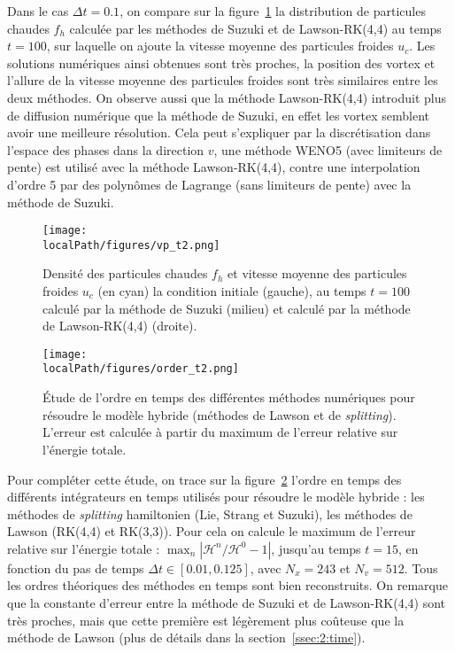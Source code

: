 Dans le cas $\Delta t=0.1$, on compare sur la figure~\ref{fig:vp:t2} la distribution de particules chaudes $f_h$ calculée par les méthodes de Suzuki et de Lawson-RK(4,4) au temps $t=100$, sur laquelle on ajoute la vitesse moyenne des particules froides $u_c$. Les solutions numériques ainsi obtenues sont très proches, la position des vortex et l'allure de la vitesse moyenne des particules froides sont très similaires entre les deux méthodes. On observe aussi que la méthode Lawson-RK(4,4) introduit plus de diffusion numérique que la méthode de Suzuki, en effet les vortex semblent avoir une meilleure résolution. Cela peut s'expliquer par la discrétisation dans l'espace des phases dans la direction $v$, une méthode WENO5 (avec limiteurs de pente) est utilisé avec la méthode Lawson-RK(4,4), contre une interpolation d'ordre 5 par des polynômes de Lagrange (sans limiteurs de pente) avec la méthode de Suzuki.

\begin{figure}[h]
  \centering
  \texttt{[image: \\localPath/figures/vp\_t2.png]}
  \caption{Densité des particules chaudes $f_h$ et vitesse moyenne des particules froides $u_c$ (en cyan) la condition initiale (gauche), au temps $t=100$ calculé par la méthode de Suzuki (milieu) et calculé par la méthode de Lawson-RK(4,4) (droite).}
  \label{fig:vp:t2}
\end{figure}

\begin{figure}
	\centering
	\texttt{[image: \\localPath/figures/order\_t2.png]}
	\caption{Étude de l'ordre en temps des différentes méthodes numériques pour résoudre le modèle hybride (méthodes de Lawson et de \emph{splitting}). L'erreur est calculée à partir du maximum de l'erreur relative sur l'énergie totale.}
	\label{fig:order:t2}
\end{figure}

Pour compléter cette étude, on trace sur la figure~\ref{fig:order:t2} l'ordre en temps des différents intégrateurs en temps utilisés pour résoudre le modèle hybride : les méthodes de \emph{splitting} hamiltonien (Lie, Strang et Suzuki), les méthodes de Lawson (RK(4,4) et RK(3,3)). Pour cela on calcule le maximum de l'erreur relative sur l'énergie totale : $\max_n|\mathcal{H}^n/\mathcal{H}^0-1|$, jusqu'au temps $t=15$, en fonction du pas de temps $\Delta t\in[0.01,0.125]$, avec $N_x=243$ et $N_v=512$. Tous les ordres théoriques des méthodes en temps sont bien reconstruits. On remarque que la constante d'erreur entre la méthode de Suzuki et de Lawson-RK(4,4) sont très proches, mais que cette première est légèrement plus coûteuse que la méthode de Lawson (plus de détails dans la section~\ref{ssec:2:time}).

